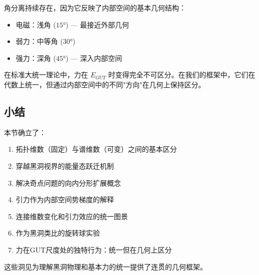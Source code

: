 角分离持续存在，因为它反映了内部空间的基本几何结构：
\begin{itemize}
    \item 电磁：浅角 ($15°$) — 最接近外部几何
    \item 弱力：中等角 ($30°$)
    \item 强力：深角 ($45°$) — 深入内部空间
\end{itemize}

\begin{remark}[与标准大统一理论的对比]
在标准大统一理论中，力在 $E_{GUT}$ 时变得完全不可区分。在我们的框架中，它们在代数上统一，但通过内部空间中的不同"方向"在几何上保持区分。
\end{remark}

\subsection{小结}

本节确立了：
\begin{enumerate}
    \item 拓扑维数（固定）与谱维数（可变）之间的基本区分
    \item 穿越黑洞视界的能量态跃迁机制
    \item 解决奇点问题的向内分形扩展概念
    \item 引力作为内部空间势梯度的解释
    \item 连接维数变化和引力效应的统一图景
    \item 作为黑洞类比的旋转球实验
    \item 力在GUT尺度处的独特行为：统一但在几何上区分
\end{enumerate}

这些洞见为理解黑洞物理和基本力的统一提供了连贯的几何框架。

